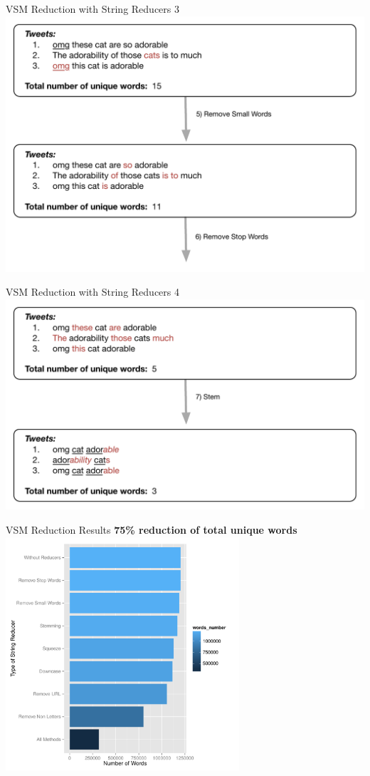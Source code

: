 \begin{frame}{VSM Reduction with String Reducers 3}
  \includegraphics[width=1\textwidth]{images/string_reduction_3.pdf}
\end{frame}

\begin{frame}{VSM Reduction with String Reducers 4}
  \includegraphics[width=1\textwidth]{images/string_reduction_4.pdf}
\end{frame}

\begin{frame}{VSM Reduction Results}
  \textbf{75\% reduction of total unique words}
  \includegraphics[width=0.65\textwidth]{images/plot_wordcount.pdf}
\end{frame}

